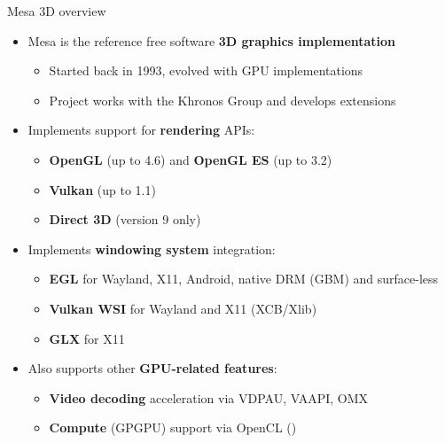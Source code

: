 \begin{frame}{Mesa 3D overview}
  \begin{itemize}
  \item Mesa is the reference free software \textbf{3D graphics implementation}
    \begin{itemize}
    \item Started back in 1993, evolved with GPU implementations
    \item Project works with the Khronos Group and develops extensions
    \end{itemize}
  \item Implements support for \textbf{rendering} APIs:
    \begin{itemize}
    \item \textbf{OpenGL} (up to 4.6) and \textbf{OpenGL ES} (up to 3.2)
    \item \textbf{Vulkan} (up to 1.1)
    \item \textbf{Direct 3D} (version 9 only)
    \end{itemize}
  \item Implements \textbf{windowing system} integration:
    \begin{itemize}
    \item \textbf{EGL} for Wayland, X11, Android, native DRM (GBM) and surface-less
    \item \textbf{Vulkan WSI} for Wayland and X11 (XCB/Xlib)
    \item \textbf{GLX} for X11
    \end{itemize}
  \item Also supports other \textbf{GPU-related features}:
    \begin{itemize}
    \item \textbf{Video decoding} acceleration via VDPAU, VAAPI, OMX
    \item \textbf{Compute} (GPGPU) support via OpenCL ()
    \end{itemize}
  \end{itemize}
\end{frame}

